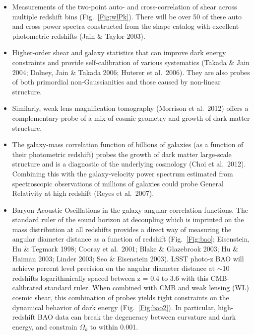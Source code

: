 \documentclass{emulateapj}
\begin{document}
\begin{itemize}
\item Measurements of the two-point auto- and cross-correlation of
  shear across multiple redshift bins (Fig.~\ref{Fig:wlPk}). There will be 
over 50 of these auto and cross power spectra constructed from the
shape catalog with excellent photometric redshifts
(Jain \& Taylor 2003).
\item Higher-order shear and galaxy statistics that can improve dark energy 
constraints and provide self-calibration of various systematics (Takada \& Jain 2004; 
Dolney, Jain \& Takada 2006; Huterer et al.~2006). They are also probes of both
primordial non-Gaussianities and those caused by non-linear structure.
\item Similarly, weak lens magnification tomography (Morrison et al.~2012) offers a 
complementary probe of a mix of cosmic geometry and growth of dark matter structure.
\item The galaxy-mass correlation function of billions of galaxies (as a function of their 
photometric redshift) probes the growth of dark matter large-scale structure and is a 
diagnostic of the underlying cosmology (Choi et al.~2012). Combining this with the 
galaxy-velocity power spectrum estimated from spectroscopic observations of millions of galaxies 
could probe General Relativity at high redshift (Reyes et al.~2007).
\item Baryon Acoustic Oscillations in the galaxy angular correlation functions.
The standard ruler of the sound horizon at decoupling which is imprinted on the mass 
distribution at all redshifts provides a direct way of measuring the angular diameter
distance as a function of redshift (Fig.~\ref{Fig:bao}; Eisenstein, Hu \& Tegmark 1998;
Cooray et al.~2001; Blake \& Glazebrook 2003; Hu \& Haiman 2003; Linder 2003; Seo \& 
Eisenstein 2003). LSST photo-z BAO will achieve percent level precision on the angular 
diameter distance at $\sim$10 redshifts logarithmically spaced between z = 0.4 to 3.6 
with this CMB-calibrated standard ruler. When combined with CMB 
and weak lensing (WL) cosmic shear, this combination of probes yields tight constraints on the 
dynamical behavior of dark energy (Fig.~\ref{Fig:bao2}). In particular, high-redshift BAO data can break 
the degeneracy between curvature and dark energy, and constrain $\Omega_k$ to within 
0.001.

\end{itemize}
\end{document}
